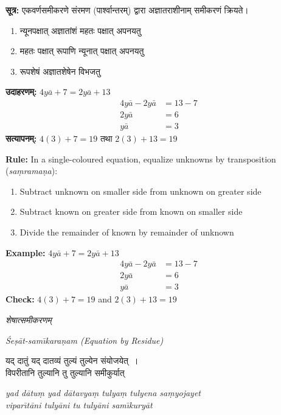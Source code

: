 \documentclass[11pt,a4paper]{article}
\newcommand{\dev}[1]{{\devanagarifont #1}}
\newcommand{\bicol}[2]{%
\noindent%
\begin{minipage}[t]{0.48\textwidth}
\begin{flushleft}
\small
#1
\end{flushleft}
\end{minipage}%
\hfill%
\begin{minipage}[t]{0.48\textwidth}
\begin{flushleft}
\small
#2
\end{flushleft}
\end{minipage}%
\vspace{0.4em}
}
\newcommand{\bicolverse}[2]{%
\par\noindent%
\begin{minipage}[t]{0.48\textwidth}
\centering
\color{versecolor}
\devanagarifont
\small
#1
\end{minipage}%
\hfill%
\begin{minipage}[t]{0.48\textwidth}
\centering
\color{versecolor}
\small
#2
\end{minipage}%
\par\vspace{0.4em}
}
\newcommand{\subsectionbicol}[2]{%
\vspace{0.4em}
\noindent%
\begin{minipage}[t]{0.48\textwidth}
\begin{center}
\normalsize\itshape\color{sectioncolor}
\dev{#1}
\end{center}
\end{minipage}%
\hfill%
\begin{minipage}[t]{0.48\textwidth}
\begin{center}
\normalsize\itshape\color{sectioncolor}
#2
\end{center}
\end{minipage}%
\vspace{0.2em}
}
\begin{document}
\bicol{%
\textbf{सूत्र:} एकवर्णसमीकरणे \dev{संरमण} (पार्श्वान्तरम्) द्वारा अज्ञातराशीनाम् समीकरणं क्रियते।
\begin{enumerate}[leftmargin=1.5em,topsep=0pt]
\item न्यूनपक्षात् अज्ञातांशं महतः पक्षात् अपनयतु
\item महतः पक्षात् रूपाणि न्यूनात् पक्षात् अपनयतु
\item रूपशेषं अज्ञातशेषेन विभजतु
\end{enumerate}
\textbf{उदाहरणम्:} $4y\bar{a} + 7 = 2y\bar{a} + 13$
\begin{align*}
4y\bar{a} - 2y\bar{a} &= 13 - 7 \\
2y\bar{a} &= 6 \\
y\bar{a} &= 3
\end{align*}
\textbf{सत्यापनम्:} $4(3) + 7 = 19$ तथा $2(3) + 13 = 19$ \checkmark
}{%
\textbf{Rule:} In a single-coloured equation, equalize unknowns by transposition (\textit{sa\d{m}rama\d{n}a}):
\begin{enumerate}[leftmargin=1.5em,topsep=0pt]
\item Subtract unknown on smaller side from unknown on greater side
\item Subtract known on greater side from known on smaller side
\item Divide the remainder of known by remainder of unknown
\end{enumerate}
\textbf{Example:} $4y\bar{a} + 7 = 2y\bar{a} + 13$
\begin{align*}
4y\bar{a} - 2y\bar{a} &= 13 - 7 \\
2y\bar{a} &= 6 \\
y\bar{a} &= 3
\end{align*}
\textbf{Check:} $4(3) + 7 = 19$ and $2(3) + 13 = 19$ \checkmark
}

\clearpage

\subsectionbicol{शेषात्समीकरणम्}{\'{S}e\d{s}\={a}t-sam\={\i}kara\d{n}am (Equation by Residue)}

\vspace{0.3cm}

\bicolverse{%
यद् दातुं यद् दातव्यं तुल्यं तुल्येन संयोजयेत्~।\\
विपरीतानि तुल्यानि तु तुल्यानि समीकुर्यात्~
}{%
\textit{yad d\={a}tu\d{m} yad d\={a}tavya\d{m} tulya\d{m} tulyena sa\d{m}yojayet}\\
\textit{vipar\={\i}t\={a}ni tuly\={a}ni tu tuly\={a}ni sam\={\i}kury\={a}t}
}

\vspace{0.5cm}
\end{document}
